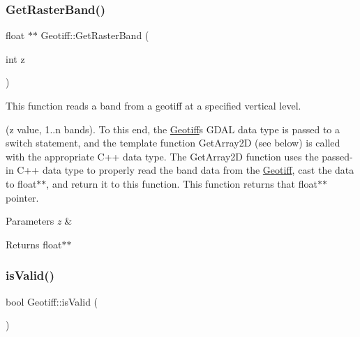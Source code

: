 \mbox{\label{class_geotiff_a07feabdc5c551695fb5aa7387727f8de}} 
\subsubsection{\texorpdfstring{Get\+Raster\+Band()}{GetRasterBand()}\hspace{0.1cm}{\footnotesize\ttfamily [2/2]}}
{\footnotesize\ttfamily float $\ast$$\ast$ Geotiff\+::\+Get\+Raster\+Band (\begin{DoxyParamCaption}\item[{int}]{z }\end{DoxyParamCaption})}



This function reads a band from a geotiff at a specified vertical level. 

(z value, 1..n bands). To this end, the \hyperlink{class_geotiff}{Geotiff}\textquotesingle{}s G\+D\+AL data type is passed to a switch statement, and the template function Get\+Array2D (see below) is called with the appropriate C++ data type. The Get\+Array2D function uses the passed-\/in C++ data type to properly read the band data from the \hyperlink{class_geotiff}{Geotiff}, cast the data to float$\ast$$\ast$, and return it to this function. This function returns that float$\ast$$\ast$ pointer. 
\begin{DoxyParams}{Parameters}
{\em z} & \\
\hline
\end{DoxyParams}
\begin{DoxyReturn}{Returns}
float$\ast$$\ast$ 
\end{DoxyReturn}
\mbox{\label{class_geotiff_a89fbf267a0d1afe1c1773201d359f3fa}} 
\subsubsection{\texorpdfstring{is\+Valid()}{isValid()}\hspace{0.1cm}{\footnotesize\ttfamily [1/2]}}
{\footnotesize\ttfamily bool Geotiff\+::is\+Valid (\begin{DoxyParamCaption}{ }\end{DoxyParamCaption})}

